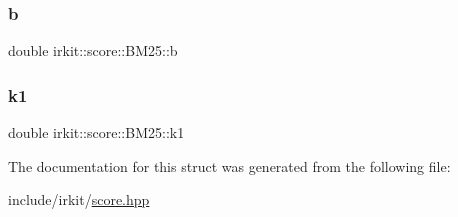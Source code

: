 \subsubsection{\texorpdfstring{b}{b}}
{\footnotesize\ttfamily double irkit\+::score\+::\+B\+M25\+::b}

\mbox{\label{structirkit_1_1score_1_1BM25_a466bb269c6c56714e0148d428bd7e1d5}} 
\subsubsection{\texorpdfstring{k1}{k1}}
{\footnotesize\ttfamily double irkit\+::score\+::\+B\+M25\+::k1}



The documentation for this struct was generated from the following file\+:\begin{DoxyCompactItemize}
\item 
include/irkit/\hyperlink{score_8hpp}{score.\+hpp}\end{DoxyCompactItemize}
